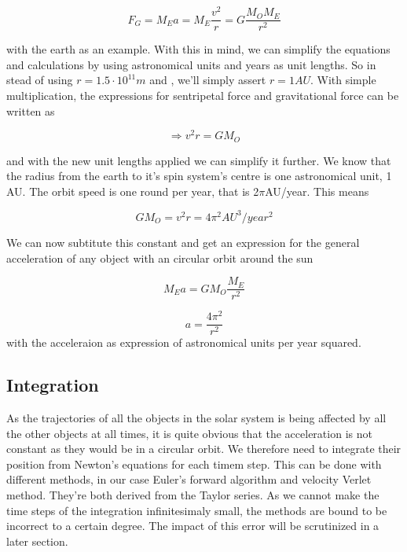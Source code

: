 \documentclass[10pt]{article}
\begin{document}
\begin{multicols}{2}
\begin{equation}
    F_G = M_Ea = M_E\frac{v^2}{r} = G\frac{M_OM_E}{r^2}
\end{equation}



with the earth as an example. With this in mind, we can simplify the
equations and calculations by using astronomical units and years as unit
lengths. So in stead of using $r = 1.5\cdot10^{11}m$ and , we'll simply
assert $r = 1AU$. With simple multiplication, the expressions for
sentripetal force and gravitational force can be written as 

\begin{equation}
    \Rightarrow v^2r = GM_O
\end{equation}

and with the new unit lengths applied we can simplify it further. We know
that the radius from the earth to it's spin system's centre is one
astronomical unit, 1 AU. The orbit speed is one round per year, that is
2$\pi$AU/year. This means

\begin{equation}
    GM_O = v^2r = 4\pi^2AU^3/year^2
\end{equation}

We can now subtitute this constant and get an expression for the general
acceleration of any object with an circular orbit around the sun

\begin{equation}
    M_Ea = GM_O\frac{M_E}{r^2}
\end{equation}

\begin{equation}
    a = \frac{4\pi^2}{r^2}
\end{equation}
with the acceleraion as expression of astronomical units per year squared. 

\subsection{Integration}
As the trajectories of all the objects in the solar system is being affected by all the other objects at all times, it is quite obvious that the acceleration is not constant as they would be in a circular orbit. We therefore need to integrate their position from Newton's equations for each timem step. This can be done with different methods, in our case Euler's forward algorithm and velocity Verlet method. They're both derived from the Taylor series. As we cannot make the time steps of the integration infinitesimaly small, the methods are bound to be incorrect to a certain degree. The impact of this error will be scrutinized in a later section.

\end{multicols}
\end{document}
